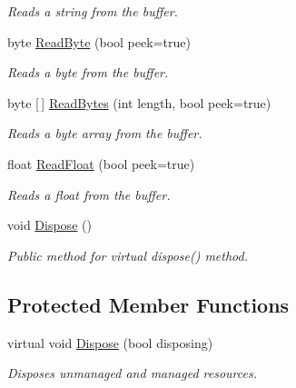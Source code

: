 \begin{DoxyCompactItemize}
\begin{DoxyCompactList}\small\item\em Reads a string from the buffer. \end{DoxyCompactList}\item 
byte \mbox{\hyperlink{class_byte_buffer_a3d3bf87754a8bba775bbba0cc7ab3ce4}{Read\+Byte}} (bool peek=true)
\begin{DoxyCompactList}\small\item\em Reads a byte from the buffer. \end{DoxyCompactList}\item 
byte \mbox{[}$\,$\mbox{]} \mbox{\hyperlink{class_byte_buffer_ab43ff1cbc334a11dfbc59b7b57cfd551}{Read\+Bytes}} (int length, bool peek=true)
\begin{DoxyCompactList}\small\item\em Reads a byte array from the buffer. \end{DoxyCompactList}\item 
float \mbox{\hyperlink{class_byte_buffer_a52fda75f3b1d2203e9f3429b5c5e393d}{Read\+Float}} (bool peek=true)
\begin{DoxyCompactList}\small\item\em Reads a float from the buffer. \end{DoxyCompactList}\item 
void \mbox{\hyperlink{class_byte_buffer_a65980af32cd7622f530cc5a30c3b23ea}{Dispose}} ()
\begin{DoxyCompactList}\small\item\em Public method for virtual dispose() method. \end{DoxyCompactList}\end{DoxyCompactItemize}
\subsection*{Protected Member Functions}
\begin{DoxyCompactItemize}
\item 
virtual void \mbox{\hyperlink{class_byte_buffer_aad8eb7dab24ee09d89f47c47f424e536}{Dispose}} (bool disposing)
\begin{DoxyCompactList}\small\item\em Disposes unmanaged and managed resources. \end{DoxyCompactList}\end{DoxyCompactItemize}
